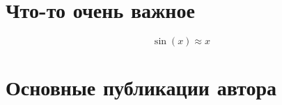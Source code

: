 \chapter{Что-то очень важное}
\label{app:details}

\[
    \sin(x) \approx x
\]


\chapter{Основные публикации автора}
\label{app:publications}



